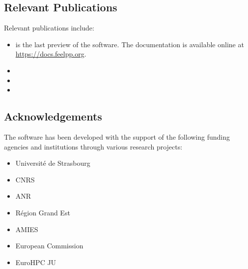 \subsection{Relevant Publications}
\label{sec:Feelpp:publications}
Relevant publications include:
\begin{itemize}
    \item {} is the last preview of the \Feelpp software. The documentation is available online at \url{https://docs.feelpp.org}.
    \item {} 
    \item {}
    \item {}
\end{itemize}

\subsection{Acknowledgements}
\label{sec::Feelpp:acknowledgements}
The software has been developed with the support of the following funding agencies and institutions through various research projects: 
\begin{itemize}
   \item Université de Strasbourg
   \item CNRS
   \item ANR
   \item Région Grand Est
   \item AMIES
   \item European Commission
   \item EuroHPC JU
\end{itemize}
